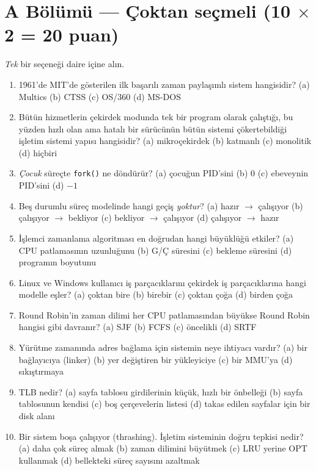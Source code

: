 \documentclass[11pt,a4paper]{article}
\newcommand{\cmd}[1]{\texttt{#1}}
\begin{document}
\section*{A Bölümü --- Çoktan seçmeli \hfill (10 $\times$ 2 = 20 puan)}
\emph{Tek} bir seçeneği daire içine alın.
\begin{enumerate}[leftmargin=2.0em,label=A\arabic*.,itemsep=0.15em]
  \item 1961'de MIT'de gösterilen ilk başarılı zaman paylaşımlı sistem hangisidir? \quad (a) Multics \quad (b) CTSS \quad (c) OS/360 \quad (d) MS-DOS
  \item Bütün hizmetlerin çekirdek modunda tek bir program olarak çalıştığı, bu yüzden hızlı olan ama hatalı bir sürücünün bütün sistemi çökertebildiği işletim sistemi yapısı hangisidir? \quad (a) mikroçekirdek \quad (b) katmanlı \quad (c) monolitik \quad (d) hiçbiri
  \item \emph{Çocuk} süreçte \cmd{fork()} ne döndürür? \quad (a) çocuğun PID'sini \quad (b) $0$ \quad (c) ebeveynin PID'sini \quad (d) $-1$
  \item Beş durumlu süreç modelinde hangi geçiş \emph{yoktur}? \quad (a) hazır $\to$ çalışıyor \quad (b) çalışıyor $\to$ bekliyor \quad (c) bekliyor $\to$ çalışıyor \quad (d) çalışıyor $\to$ hazır
  \item İşlemci zamanlama algoritması en doğrudan hangi büyüklüğü etkiler? \quad (a) CPU patlamasının uzunluğunu \quad (b) G/Ç süresini \quad (c) bekleme süresini \quad (d) programın boyutunu
  \item Linux ve Windows kullanıcı iş parçacıklarını çekirdek iş parçacıklarına hangi modelle eşler? \quad (a) çoktan bire \quad (b) birebir \quad (c) çoktan çoğa \quad (d) birden çoğa
  \item Round Robin'in zaman dilimi her CPU patlamasından büyükse Round Robin hangisi gibi davranır? \quad (a) SJF \quad (b) FCFS \quad (c) öncelikli \quad (d) SRTF
  \item Yürütme zamanında adres bağlama için sistemin neye ihtiyacı vardır? \quad (a) bir bağlayıcıya (linker) \quad (b) yer değiştiren bir yükleyiciye \quad (c) bir MMU'ya \quad (d) sıkıştırmaya
  \item TLB nedir? \quad (a) sayfa tablosu girdilerinin küçük, hızlı bir önbelleği \quad (b) sayfa tablosunun kendisi \quad (c) boş çerçevelerin listesi \quad (d) takas edilen sayfalar için bir disk alanı
  \item Bir sistem boşa çalışıyor (thrashing). İşletim sisteminin doğru tepkisi nedir? \quad (a) daha çok süreç almak \quad (b) zaman dilimini büyütmek \quad (c) LRU yerine OPT kullanmak \quad (d) bellekteki süreç sayısını azaltmak
\end{enumerate}
\end{document}
